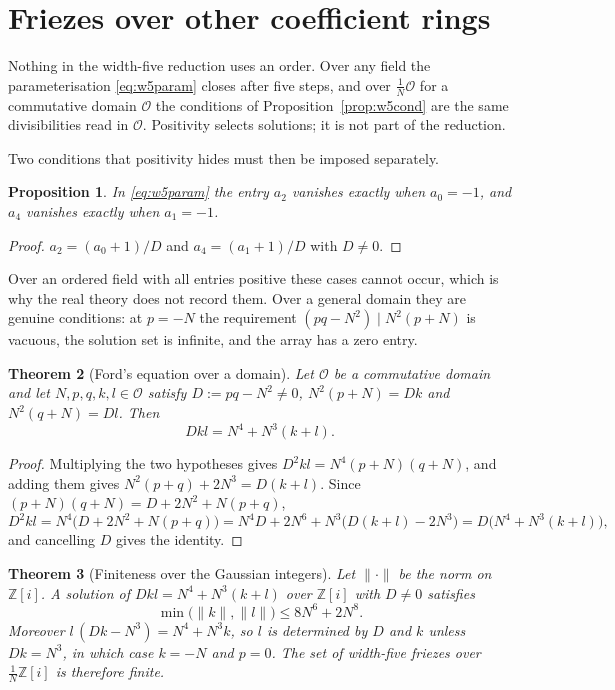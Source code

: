\documentclass[11pt]{article}
\theoremstyle{plain}
\newtheorem{theorem}{Theorem}[section]
\newtheorem{proposition}[theorem]{Proposition}
\theoremstyle{definition}
\newcommand{\Z}{\mathbb{Z}}
\begin{document}
\section{Friezes over other coefficient rings}\label{sec:rings}

Nothing in the width-five reduction uses an order. Over any field the parameterisation
\eqref{eq:w5param} closes after five steps, and over $\tfrac1N\mathcal O$ for a commutative
domain $\mathcal O$ the conditions of Proposition~\ref{prop:w5cond} are the same
divisibilities read in $\mathcal O$. Positivity selects solutions; it is not part of the
reduction.

Two conditions that positivity hides must then be imposed separately.

\begin{proposition}\label{prop:nondeg}
In \eqref{eq:w5param} the entry $a_2$ vanishes exactly when $a_0=-1$, and $a_4$ vanishes
exactly when $a_1=-1$.
\end{proposition}

\begin{proof}
$a_2=(a_0+1)/D$ and $a_4=(a_1+1)/D$ with $D\neq0$.
\end{proof}

Over an ordered field with all entries positive these cases cannot occur, which is why the
real theory does not record them. Over a general domain they are genuine conditions: at
$p=-N$ the requirement $(pq-N^2)\mid N^2(p+N)$ is vacuous, the solution set is infinite,
and the array has a zero entry.

\begin{theorem}[Ford's equation over a domain]\label{thm:fordanyring}
Let $\mathcal O$ be a commutative domain and let $N,p,q,k,l\in\mathcal O$ satisfy
$D:=pq-N^2\neq0$, $N^2(p+N)=Dk$ and $N^2(q+N)=Dl$. Then
\[
  Dkl=N^4+N^3(k+l).
\]
\end{theorem}

\begin{proof}
Multiplying the two hypotheses gives $D^2kl=N^4(p+N)(q+N)$, and adding them gives
$N^2(p+q)+2N^3=D(k+l)$. Since $(p+N)(q+N)=D+2N^2+N(p+q)$,
\[
  D^2kl=N^4\bigl(D+2N^2+N(p+q)\bigr)=N^4D+2N^6+N^3\bigl(D(k+l)-2N^3\bigr)
       =D\bigl(N^4+N^3(k+l)\bigr),
\]
and cancelling $D$ gives the identity.
\end{proof}

\begin{theorem}[Finiteness over the Gaussian integers]\label{thm:gaussfinite}
Let $\lVert\cdot\rVert$ be the norm on $\Z[i]$. A solution of $Dkl=N^4+N^3(k+l)$ over
$\Z[i]$ with $D\neq0$ satisfies
\[
  \min\bigl(\lVert k\rVert,\lVert l\rVert\bigr)\le 8N^6+2N^8 .
\]
Moreover $l\,(Dk-N^3)=N^4+N^3k$, so $l$ is determined by $D$ and $k$ unless $Dk=N^3$, in
which case $k=-N$ and $p=0$. The set of width-five friezes over $\tfrac1N\Z[i]$ is
therefore finite.
\end{theorem}
\end{document}
